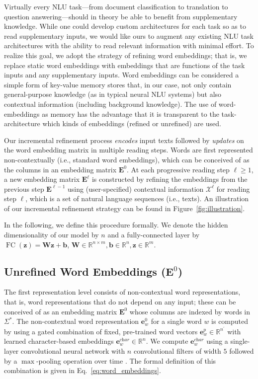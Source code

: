 \documentclass[11pt,a4paper]{article}
\begin{document}
Virtually every NLU task---from document classification to translation to question answering---should in theory be able to benefit from supplementary knowledge. While one could develop custom architectures for each task so as to read supplementary inputs, we would like ours to augment any existing NLU task architectures with the ability to read relevant information with minimal effort. To realize this goal, we adopt the strategy of refining word embeddings; that is, we replace static word embeddings with embeddings that are functions of the task inputs and any supplementary inputs.
Word embeddings can be considered a simple form of key-value memory stores that, in our case, not only contain general-purpose knowledge (as in typical neural NLU systems) but also contextual information (including background knowledge). The use of word-embeddings as memory has the advantage that it is transparent to the task-architecture which kinds of embeddings (refined or unrefined) are used.

Our incremental refinement process \textit{encodes} input texts followed by \textit{updates} on the word embedding matrix in multiple reading steps. Words are first represented non-contextually (i.e., standard word embeddings), which can be conceived of as the columns in an embedding matrix $\mathbf{E}^0$. At each progressive reading step $\ell \ge 1$, a new embedding matrix $\mathbf{E}^\ell$ is constructed by refining the embeddings from the previous step $\mathbf{E}^{\ell-1}$ using (user-specified) contextual information $\mathcal{X}^\ell$ for reading step $\ell$, which is a set of natural language sequences (i.e., texts). 
An illustration of our incremental refinement strategy can be found in Figure~\ref{fig:illustration}.

In the following, we define this procedure formally. We denote the hidden dimensionality of our model by $n$ and a fully-connected layer by $\operatorname{FC}(\mathbf{z})=\mathbf{Wz}+\mathbf{b}$, $\mathbf{W}\in \mathbb{R}^{n \times m}, \mathbf{b}\in\mathbb{R}^n, \mathbf{z}\in\mathbb{R}^m$.

\subsection{Unrefined Word Embeddings ($\mathbf{E}^0$)}\label{sec:noncontextual_embeddings}
The first representation level consists of non-contextual word representations, that is, word representations that do not depend on any input; these can be conceived of as an embedding matrix $\mathbf{E}^0$ whose columns are indexed by words in $\Sigma^*$. The non-contextual word representation $\mathbf{e}^0_w$ for a single word $w$ is computed by using a gated combination of fixed, pre-trained word vectors $\mathbf{e}^p_{w} \in \mathbb{R}^{n^\prime}$ with learned character-based embeddings $\mathbf{e}_w^{\textit{char}} \in \mathbb{R}^n$. We compute $\mathbf{e}_w^{\textit{char}}$ using a single-layer convolutional neural network with $n$ convolutional filters of width $5$ followed by a $\max$-pooling operation over time \citep{Seo2017,Weissenborn2017}. The formal definition of this combination is given in Eq.~\ref{eq:word_embeddings}.
\end{document}
